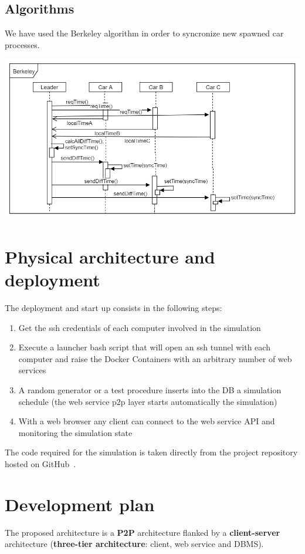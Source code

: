 \subsection{Algorithms}

We have used the Berkeley algorithm in order to syncronize new spawned car processes.

\begin{center}
    \includegraphics[scale=0.6]{assets/berkeley.png}
\end{center}

\section{Physical architecture and deployment}

The deployment and start up consists in the following steps:
\begin{enumerate}
    \item Get the ssh credentials of each computer involved in the simulation
    \item Execute a launcher bash script that will open an ssh tunnel with each computer and 
        raise the Docker Containers with an arbitrary number of web services 
    \item A random generator or a test procedure inserts into the DB a simulation schedule
        (the web service p2p layer starts automatically the simulation)
    \item With a web browser any client can connect to the web service API and monitoring 
        the simulation state   
\end{enumerate}

The code required for the simulation is taken directly from the project repository hosted on 
GitHub~\cite{2}.


\section{Development plan}

The proposed architecture is a \textbf{P2P} architecture flanked by a 
\textbf{client-server} architecture (\textbf{three-tier architecture}: client, web service and DBMS).
